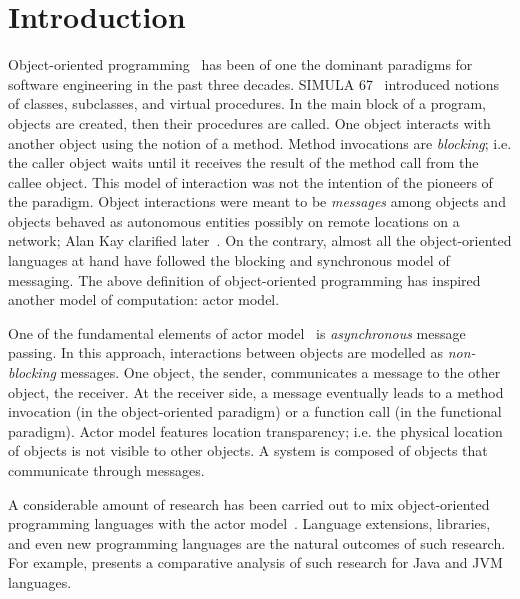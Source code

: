 
\chapter[Introduction]{Introduction}
\label{ch:intro}
\label{sec:intro:abs}


Object-oriented programming~\cite{booch1982object,meyer1988object} has been of one the dominant paradigms for software engineering in the past three decades.
SIMULA 67~\cite{Dahl:1968:simula} introduced notions of classes, subclasses, and virtual procedures.
In the main block of a program, objects are created, then their procedures are called.
One object interacts with another object using the notion of a method.
Method invocations are \emph{blocking}; i.e. the caller object waits until it receives the result of the method call from the callee object.
This model of interaction was not the intention of the pioneers of the paradigm.
Object interactions were meant to be \emph{messages} among objects and objects behaved as autonomous entities possibly on remote locations on a network; Alan Kay clarified later~\cite{alank1,alank2}. 
On the contrary, almost all the object-oriented languages at hand have followed the blocking and synchronous model of messaging. 
The above definition of object-oriented programming has inspired another model of computation: actor model.

One of the fundamental elements of actor model~\cite{actors:agha,agha97} is \emph{asynchronous} message passing.
In this approach, interactions between objects are modelled as \emph{non-blocking} messages.
One object, the sender, communicates a message to the other object, the receiver.
At the receiver side, a message eventually leads to a method invocation (in the object-oriented paradigm) or a function call (in the functional paradigm).
Actor model features location transparency; i.e. the physical location of objects is not visible to other objects.
A system is composed of objects that communicate through messages.

A considerable amount of research has been carried out to mix object-oriented programming languages with the actor model~\cite{philippsen2000survey}. 
Language extensions, libraries, and even new programming languages are the natural outcomes of such research.
For example, \cite{actor_frameworks_jvm:agha} presents a comparative analysis of such research for Java and JVM languages.


